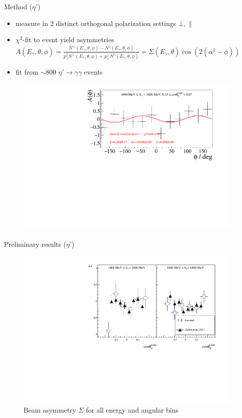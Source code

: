 \documentclass[11pt,aspectratio=169,dvipsnames]{beamer}
\begin{document}
\begin{frame}{Method ($\eta'$)}

	\begin{itemize}
		\item measure in 2 distinct orthogonal polarization settings $\bot,\parallel$
		\item $\chi^2$-fit to event yield asymmetries $A(E_\gamma,\theta,\phi)=\frac{N^\bot(E_\gamma,\theta,\phi)-N^\parallel(E_\gamma,\theta,\phi)}{p_\gamma^\parallel N^\bot(E_\gamma,\theta,\phi) + p_\gamma^\bot N^\parallel(E_\gamma,\theta,\phi)}=\Sigma(E_\gamma,\theta)\cos\left(2\left(\alpha^\parallel-\phi\right)\right)$
		\item fit from $\sim 800$ $\eta'\to\gamma\gamma$ events
	\end{itemize}
\vspace{-0.5cm}
\begin{figure}
	\centering
	\includegraphics[width=.66\linewidth]{asym_bin}
\end{figure}


\end{frame}
\begin{frame}{Preliminary results ($\eta'$)}
	\begin{figure}
		\centering
		\includegraphics[width=.8\linewidth]{sigma}
		\caption*{Beam asymmetry $\Sigma$ for all energy and angular bins}
	\end{figure}
\end{frame}
\end{document}
